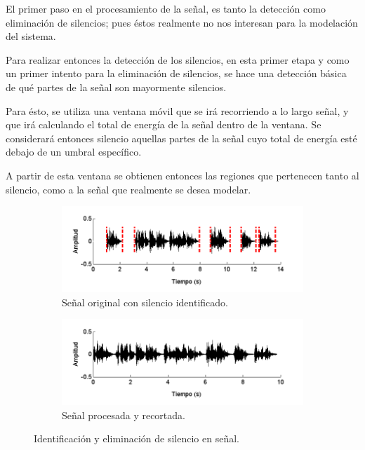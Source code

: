 El primer paso en el procesamiento de la señal, es tanto la detección como eliminación de silencios; pues éstos realmente no nos interesan para la modelación del sistema.


Para realizar entonces la detección de los silencios, en esta primer etapa y como un primer intento para la eliminación de silencios, se hace una detección básica de qué partes de la señal son mayormente silencios.

Para ésto, se utiliza una ventana móvil que se irá recorriendo a lo largo señal, y que irá calculando el total de energía de la señal dentro de la ventana. Se considerará entonces silencio aquellas partes de la señal cuyo total de energía esté debajo de un umbral específico.

A partir de esta ventana se obtienen entonces las regiones que pertenecen tanto al silencio, como a la señal que realmente se desea modelar.

\begin{figure}[bth]
  \begin{subfigure}[b]{\textwidth}
    \includegraphics[width=0.9\linewidth]{gfx/chap5/signal-silence}
    \caption{Señal original con silencio identificado.}
    \label{fig:sign_silence}  
  \end{subfigure}

  \begin{subfigure}[b]{\textwidth}
    \includegraphics[width=0.9\linewidth]{gfx/chap5/signal-trunc}
    \caption{Señal procesada y recortada.}
    \label{fig:sign_trunc}  
  \end{subfigure}
  
  \caption{Identificación y eliminación de silencio en señal.}  
  \label{fig:sign_ident}  
\end{figure}

